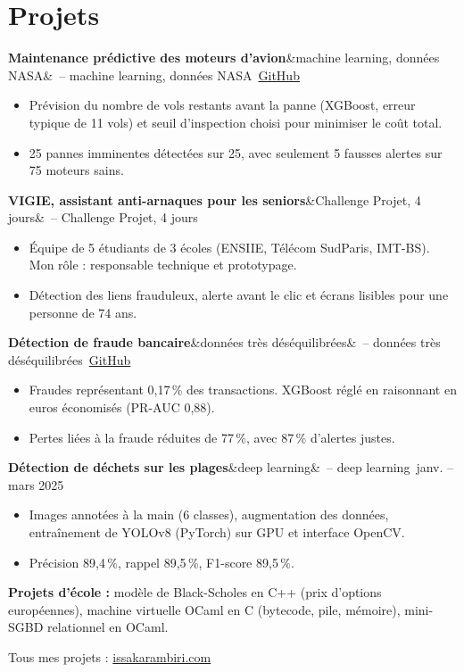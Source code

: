 \documentclass[10pt]{article}
\newcommand{\entree}[3]{\par\noindent\textbf{#1}\ifx&#2&\else\ {\color{gris}-- #2}\fi\ \hfill{\color{gris}#3}\par\vspace{1pt}}
\begin{document}
\section*{Projets}
\entree{Maintenance prédictive des moteurs d'avion}{machine learning, données NASA}{\href{https://github.com/KARAMBIRI65/maintenance-predictive-moteurs-avion}{GitHub}}
\begin{itemize}
  \item Prévision du nombre de vols restants avant la panne (XGBoost, erreur typique de 11 vols) et seuil d'inspection choisi pour minimiser le coût total.
  \item 25 pannes imminentes détectées sur 25, avec seulement 5 fausses alertes sur 75 moteurs sains.
\end{itemize}
\vspace{3pt}
\entree{VIGIE, assistant anti-arnaques pour les seniors}{Challenge Projet, 4 jours}{}
\begin{itemize}
  \item Équipe de 5 étudiants de 3 écoles (ENSIIE, Télécom SudParis, IMT-BS). Mon rôle : responsable technique et prototypage.
  \item Détection des liens frauduleux, alerte avant le clic et écrans lisibles pour une personne de 74 ans.
\end{itemize}
\vspace{3pt}
\entree{Détection de fraude bancaire}{données très déséquilibrées}{\href{https://github.com/KARAMBIRI65/detection-fraude-bancaire}{GitHub}}
\begin{itemize}
  \item Fraudes représentant 0,17\,\% des transactions. XGBoost réglé en raisonnant en euros économisés (PR-AUC 0,88).
  \item Pertes liées à la fraude réduites de 77\,\%, avec 87\,\% d'alertes justes.
\end{itemize}
\vspace{3pt}
\entree{Détection de déchets sur les plages}{deep learning}{janv. -- mars 2025}
\begin{itemize}
  \item Images annotées à la main (6 classes), augmentation des données, entraînement de YOLOv8 (PyTorch) sur GPU et interface OpenCV.
  \item Précision 89,4\,\%, rappel 89,5\,\%, F1-score 89,5\,\%.
\end{itemize}
\vspace{3pt}
\textbf{Projets d'école :} modèle de Black-Scholes en C++ (prix d'options européennes), machine virtuelle OCaml en C (bytecode, pile, mémoire), mini-SGBD relationnel en OCaml.\par
{\color{gris}Tous mes projets : \href{https://issakarambiri.com}{issakarambiri.com}}
\end{document}
